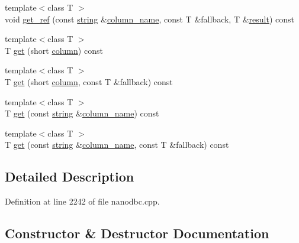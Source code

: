 \begin{DoxyCompactItemize}
\item 
{\footnotesize template$<$class T $>$ }\\void \mbox{\hyperlink{classnanodbc_1_1result_1_1result__impl_a1a35ae37c9f6059277186f934b09cf12}{get\+\_\+ref}} (const \mbox{\hyperlink{namespacenanodbc_abfc0ece56278e590911ec8352774c212}{string}} \&\mbox{\hyperlink{classnanodbc_1_1result_1_1result__impl_a5a02e1effc6a3372b6769d54d04abe2e}{column\+\_\+name}}, const T \&fallback, T \&\mbox{\hyperlink{classnanodbc_1_1result}{result}}) const
\item 
{\footnotesize template$<$class T $>$ }\\T \mbox{\hyperlink{classnanodbc_1_1result_1_1result__impl_afc1736dfab9e13f345332e6b95892f5c}{get}} (short \mbox{\hyperlink{classnanodbc_1_1result_1_1result__impl_a3863b14d505105da14acf42e7bc4ca03}{column}}) const
\item 
{\footnotesize template$<$class T $>$ }\\T \mbox{\hyperlink{classnanodbc_1_1result_1_1result__impl_a8f1e9e6c890d4c0a6909455abb2293ce}{get}} (short \mbox{\hyperlink{classnanodbc_1_1result_1_1result__impl_a3863b14d505105da14acf42e7bc4ca03}{column}}, const T \&fallback) const
\item 
{\footnotesize template$<$class T $>$ }\\T \mbox{\hyperlink{classnanodbc_1_1result_1_1result__impl_a3f3733ce4bdeb23899a19114ad9e0c8c}{get}} (const \mbox{\hyperlink{namespacenanodbc_abfc0ece56278e590911ec8352774c212}{string}} \&\mbox{\hyperlink{classnanodbc_1_1result_1_1result__impl_a5a02e1effc6a3372b6769d54d04abe2e}{column\+\_\+name}}) const
\item 
{\footnotesize template$<$class T $>$ }\\T \mbox{\hyperlink{classnanodbc_1_1result_1_1result__impl_a5ae17f6c7746a30b8b35868e52b273e1}{get}} (const \mbox{\hyperlink{namespacenanodbc_abfc0ece56278e590911ec8352774c212}{string}} \&\mbox{\hyperlink{classnanodbc_1_1result_1_1result__impl_a5a02e1effc6a3372b6769d54d04abe2e}{column\+\_\+name}}, const T \&fallback) const
\end{DoxyCompactItemize}


\subsection{Detailed Description}


Definition at line 2242 of file nanodbc.\+cpp.



\subsection{Constructor \& Destructor Documentation}
\mbox{\label{classnanodbc_1_1result_1_1result__impl_a14b32bc4ecc2c0dc5a3301bf90eb8c57}} 

